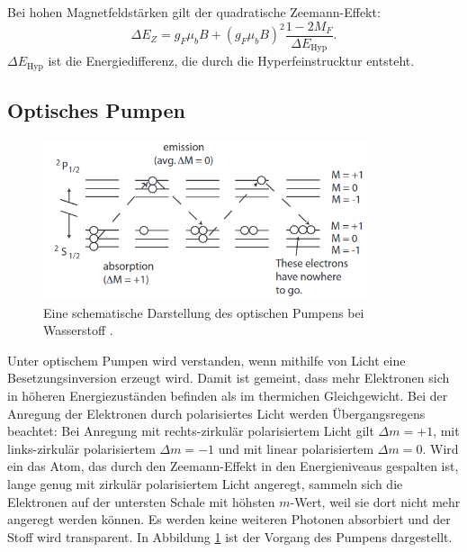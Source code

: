 \noindent Bei hohen Magnetfeldstärken gilt der quadratische Zeemann-Effekt:
\begin{equation}
    \label{eq:quad_zee}
    \Delta E_Z = g_F \mu_b B +  
    \left(g_F \mu_b B \right)^2 \frac{1 -2 M_F}{\Delta E_\text{Hyp}}.
\end{equation}
\noindent $\Delta E_\text{Hyp}$ ist die Energiedifferenz,
die durch die Hyperfeinstrucktur entsteht.

\subsection{Optisches Pumpen}
\begin{figure}[h!]
    \centering
    \includegraphics[width=0.85\textwidth]{Fotos/pumpen.png}
    \caption{Eine schematische Darstellung 
    des optischen Pumpens bei Wasserstoff \cite{pumpen_caltech}.}
    \label{fig:pumpen}
\end{figure}

Unter optischem Pumpen wird verstanden,
wenn mithilfe von Licht eine Besetzungsinversion erzeugt wird.
Damit ist gemeint, 
dass mehr Elektronen sich in höheren Energiezuständen befinden 
als im thermichen Gleichgewicht.
Bei der Anregung der Elektronen 
durch polarisiertes Licht werden Übergangsregens beachtet:
Bei Anregung mit rechts-zirkulär polarisiertem Licht gilt $\Delta m = +1$,
mit links-zirkulär polarisiertem $\Delta m = -1$
und mit linear polarisiertem $\Delta m = 0$.
Wird ein das Atom, 
das durch den Zeemann-Effekt in den Energieniveaus gespalten ist,
lange genug mit zirkulär polarisiertem Licht angeregt,
sammeln sich die Elektronen auf der untersten Schale mit höhsten $m$-Wert,
weil sie dort nicht mehr angeregt werden können. 
Es werden keine weiteren Photonen absorbiert 
und der Stoff wird transparent.
In Abbildung \ref{fig:pumpen} ist der Vorgang des Pumpens dargestellt.
\newline \newline


